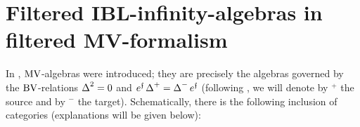 \documentclass[\MainFolder/Text.tex]{subfiles}
\begin{document}
\section{Filtered IBL-infinity-algebras in filtered MV-formalism}\label{Sec:FilteredMV}

In \cite{Markl2015}, $\mathrm{MV}$-algebras were introduced; they are precisely the algebras governed by the $\mathrm{BV}$-relations $\operatorname{\Delta}^2 = 0$ and $e^{\mathfrak{f}} \operatorname{\Delta}^+ = \operatorname{\Delta}^- e^{\mathfrak{f}}$ (following \cite{Cieliebak2015}, we will denote by ${}^+$ the source and by ${}^-$ the target). Schematically, there is the following inclusion of categories (explanations will be given below):
\end{document}
